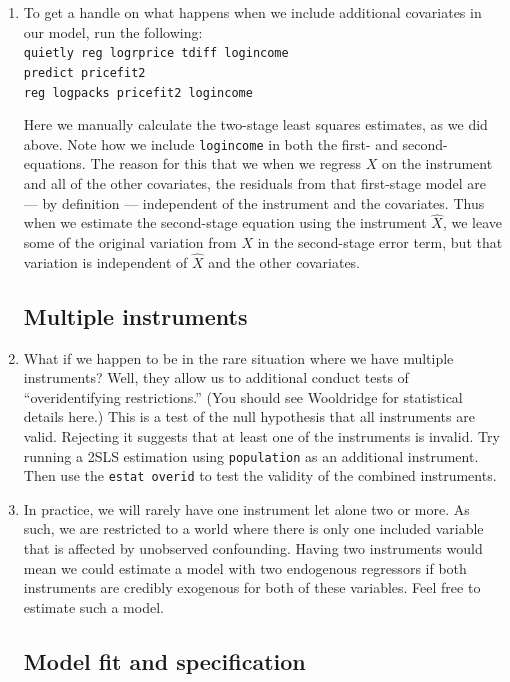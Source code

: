 \documentclass[a4paper,12pt]{article}
\begin{document}
\begin{enumerate}
\item To get a handle on what happens when we include additional covariates in our model, run the following:\\
\texttt{quietly reg logrprice tdiff logincome\\
predict pricefit2\\
reg logpacks pricefit2 logincome}

Here we manually calculate the two-stage least squares estimates, as we did above. Note how we include \texttt{logincome} in both the first- and second-equations. The reason for this that we when we regress $X$ on the instrument and all of the other covariates, the residuals from that first-stage model are --- by definition --- independent of the instrument and the covariates. Thus when we estimate the second-stage equation using the instrument $\hat{X}$, we leave some of the original variation from $X$ in the second-stage error term, but that variation is independent of $\hat{X}$ and the other covariates.

\subsection*{Multiple instruments}

\item What if we happen to be in the rare situation where we have multiple instruments? Well, they allow us to additional conduct tests of ``overidentifying restrictions.'' (You should see Wooldridge for statistical details here.) This is a test of the null hypothesis that all instruments are valid. Rejecting it suggests that at least one of the instruments is invalid. Try running a 2SLS estimation using \texttt{population} as an additional instrument. Then use the \texttt{estat overid} to test the validity of the combined instruments. 

\item In practice, we will rarely have one instrument let alone two or more. As such, we are restricted to a world where there is only one included variable that is affected by unobserved confounding. Having two instruments would mean we could estimate a model with two endogenous regressors if both instruments are credibly exogenous for both of these variables. Feel free to estimate such a model.

\subsection*{Model fit and specification}


\end{enumerate}
\end{document}
